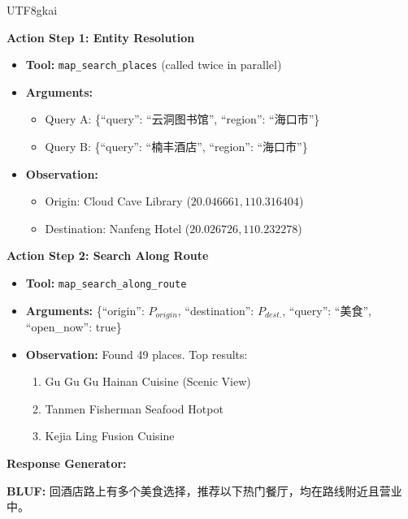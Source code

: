 \begin{CJK*}{UTF8}{gkai}
\begin{tcolorbox}[
    breakable,
    enhanced,
    colframe=color_amapblue,
    colback=mycolor,
    coltitle=white,
    title = {\textbf{Case Study: Route-based Dining Recommendation}},
    fonttitle=\bfseries
]
\textbf{Action Step 1: Entity Resolution}
\begin{itemize}[leftmargin=12pt, itemsep=0pt]
  \item \textbf{Tool:} \texttt{map\_search\_places} (called twice in parallel)
  \item \textbf{Arguments:} 
    \begin{itemize}[leftmargin=10pt]
        \item Query A: \{``query'': ``云洞图书馆'', ``region'': ``海口市''\}
        \item Query B: \{``query'': ``楠丰酒店'', ``region'': ``海口市''\}
    \end{itemize}
  \item \textbf{Observation:} 
    \begin{itemize}[leftmargin=10pt]
        \item Origin: Cloud Cave Library ($20.046661, 110.316404$)
        \item Destination: Nanfeng Hotel ($20.026726, 110.232278$)
    \end{itemize}
\end{itemize}
\vspace{5pt}
\textbf{Action Step 2: Search Along Route}
\begin{itemize}[leftmargin=12pt, itemsep=0pt]
  \item \textbf{Tool:} \texttt{map\_search\_along\_route}
  \item \textbf{Arguments:} 
    \{``origin'': $P_{origin}$, ``destination'': $P_{dest.}$, ``query'': ``美食'', ``open\_now'': true\}
  \item \textbf{Observation:} Found 49 places. Top results:
    \begin{enumerate}[leftmargin=15pt, label=\arabic*.]
        \item Gu Gu Gu Hainan Cuisine (Scenic View)
        \item Tanmen Fisherman Seafood Hotpot
        \item Kejia Ling Fusion Cuisine
    \end{enumerate}
\end{itemize}

\vspace{5pt}

\textbf{Response Generator:}
\begin{tcolorbox}[colback=white, colframe=color_amapblue!30!white, arc=4pt, boxrule=1pt, left=4pt, right=4pt, top=4pt, bottom=4pt]
    \small
    \textbf{BLUF:} 回酒店路上有多个美食选择，推荐以下热门餐厅，均在路线附近且营业中。
    

\end{tcolorbox}
\end{tcolorbox}
\end{CJK*}
